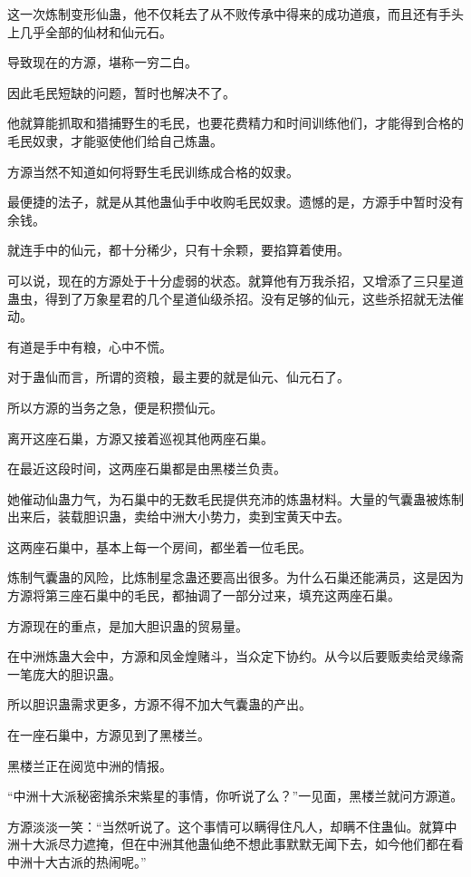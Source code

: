 \begin{this_body}
这一次炼制变形仙蛊，他不仅耗去了从不败传承中得来的成功道痕，而且还有手头上几乎全部的仙材和仙元石。

导致现在的方源，堪称一穷二白。

因此毛民短缺的问题，暂时也解决不了。

他就算能抓取和猎捕野生的毛民，也要花费精力和时间训练他们，才能得到合格的毛民奴隶，才能驱使他们给自己炼蛊。

方源当然不知道如何将野生毛民训练成合格的奴隶。

最便捷的法子，就是从其他蛊仙手中收购毛民奴隶。遗憾的是，方源手中暂时没有余钱。

就连手中的仙元，都十分稀少，只有十余颗，要掐算着使用。

可以说，现在的方源处于十分虚弱的状态。就算他有万我杀招，又增添了三只星道蛊虫，得到了万象星君的几个星道仙级杀招。没有足够的仙元，这些杀招就无法催动。

有道是手中有粮，心中不慌。

对于蛊仙而言，所谓的资粮，最主要的就是仙元、仙元石了。

所以方源的当务之急，便是积攒仙元。

离开这座石巢，方源又接着巡视其他两座石巢。

在最近这段时间，这两座石巢都是由黑楼兰负责。

她催动仙蛊力气，为石巢中的无数毛民提供充沛的炼蛊材料。大量的气囊蛊被炼制出来后，装载胆识蛊，卖给中洲大小势力，卖到宝黄天中去。

这两座石巢中，基本上每一个房间，都坐着一位毛民。

炼制气囊蛊的风险，比炼制星念蛊还要高出很多。为什么石巢还能满员，这是因为方源将第三座石巢中的毛民，都抽调了一部分过来，填充这两座石巢。

方源现在的重点，是加大胆识蛊的贸易量。

在中洲炼蛊大会中，方源和凤金煌赌斗，当众定下协约。从今以后要贩卖给灵缘斋一笔庞大的胆识蛊。

所以胆识蛊需求更多，方源不得不加大气囊蛊的产出。

在一座石巢中，方源见到了黑楼兰。

黑楼兰正在阅览中洲的情报。

“中洲十大派秘密擒杀宋紫星的事情，你听说了么？”一见面，黑楼兰就问方源道。

方源淡淡一笑：“当然听说了。这个事情可以瞒得住凡人，却瞒不住蛊仙。就算中洲十大派尽力遮掩，但在中洲其他蛊仙绝不想此事默默无闻下去，如今他们都在看中洲十大古派的热闹呢。”


\end{this_body}
